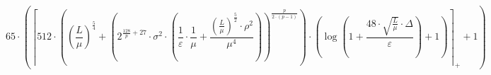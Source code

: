 \[65 \cdot \left(\left\lceil 512 \cdot \left(\left(\frac{L}{\mu}\right)^{\frac{5}{4}} + \left(2^{\frac{128}{p} + 27} \cdot \sigma^{2} \cdot \left(\frac{1}{\varepsilon} \cdot \frac{1}{\mu} + \frac{\left(\frac{L}{\mu}\right)^{\frac{5}{2}} \cdot \rho^{2}}{\mu^{4}}\right)\right)^{\frac{p}{2 \cdot \left(p - 1\right)}}\right) \cdot \left(\log\left(1 + \frac{48 \cdot \sqrt{\frac{L}{\mu}} \cdot \Delta}{\varepsilon}\right) + 1\right) \right\rceil_{+} + 1\right)\]
